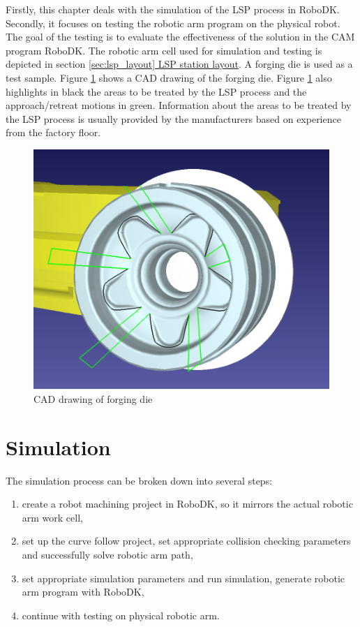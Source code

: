 \label{chap:testing}

Firstly, this chapter deals with the simulation of the LSP process in RoboDK. Secondly, it focuses on testing the robotic arm program on the physical robot. The goal of the testing is to evaluate the effectiveness of the solution in the CAM program RoboDK. The robotic arm cell used for simulation and testing is depicted in section \hyperref[sec:lsp_layout]{\ref{sec:lsp_layout} LSP station layout}. A forging die is used as a test sample. Figure \ref{fig:cad} shows a CAD drawing of the forging die. Figure \ref{fig:cad} also highlights in black the areas to be treated by the LSP process and the approach/retreat motions in green. Information about the areas to be treated by the LSP process is usually provided by the manufacturers based on experience from the factory floor.

\begin{figure}[h]
    \centering
    \includegraphics[width=0.8\linewidth]{img/cad.PNG}
    \caption{CAD drawing of forging die}
    \label{fig:cad}
\end{figure}

\section{Simulation}

The simulation process can be broken down into several steps:

\begin{enumerate}

\item create a robot machining project in RoboDK, so it mirrors the actual robotic arm work cell, 

\item set up the curve follow project, set appropriate collision checking parameters and successfully solve robotic arm path,

\item set appropriate simulation parameters and run simulation,
generate robotic arm program with RoboDK,

\item continue with testing on physical robotic arm.

\end{enumerate}

